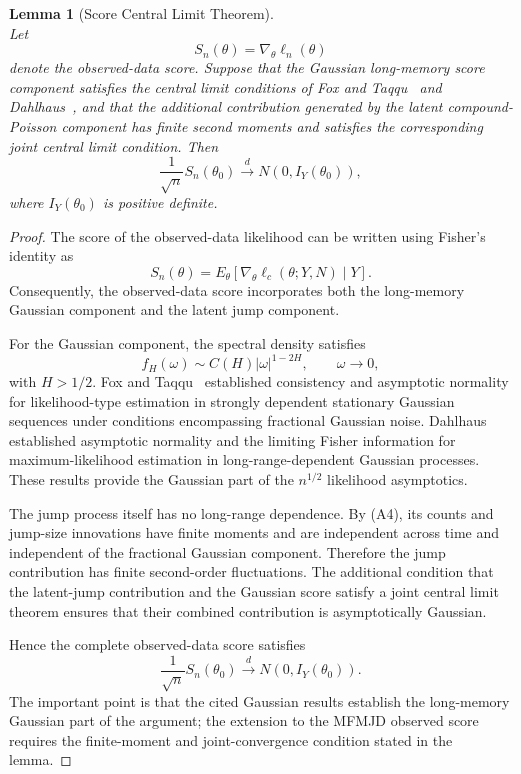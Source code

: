 \documentclass[a4paper,11pt]{amsart}
\newtheorem{lemma}{Lemma}
\theoremstyle{definition}
\theoremstyle{plain}
\theoremstyle{remark}
\newcommand{\1}{\mathbf{1}}
\begin{document}
\begin{lemma}[Score Central Limit Theorem]\mbox{}\\
Let
$$
S_n(\theta)
=
\nabla_\theta\ell_n(\theta)
$$
denote the observed-data score. Suppose that the Gaussian long-memory score component satisfies the central limit conditions of Fox and Taqqu~\cite{FoxTaqqu1986} and Dahlhaus~\cite{Dahlhaus1989}, and that the additional contribution generated by the latent compound-Poisson component has finite second moments and satisfies the corresponding joint central limit condition. 
Then
$$
\frac{1}{\sqrt n}S_n(\theta_0) \xrightarrow{d}
N\left(0,I_Y(\theta_0)\right),
$$
where $I_Y(\theta_0)$ is positive definite.
\end{lemma}

\begin{proof}
The score of the observed-data likelihood can be written using Fisher's identity as
$$
S_n(\theta)
=
E_\theta
\left[
\nabla_\theta
\ell_c(\theta;Y,N)
\mid Y
\right].
$$
Consequently, the observed-data score incorporates both the long-memory Gaussian component and the latent jump component.

For the Gaussian component, the spectral density satisfies
$$
f_H(\omega)
\sim
C(H)|\omega|^{1-2H},
\qquad
\omega\to0,
$$
with $H>1/2$. Fox and Taqqu~\cite{FoxTaqqu1986} established consistency and asymptotic normality for likelihood-type estimation in strongly dependent stationary Gaussian sequences under conditions encompassing fractional Gaussian noise. Dahlhaus~\cite{Dahlhaus1989} established asymptotic normality and the limiting Fisher information for maximum-likelihood estimation in long-range-dependent Gaussian processes. These results provide the Gaussian part of the $n^{1/2}$ likelihood asymptotics.

The jump process itself has no long-range dependence. By (A4), its counts and jump-size innovations have finite moments and are independent across time and independent of the fractional Gaussian component. Therefore the jump contribution has finite second-order fluctuations. The additional condition that the latent-jump contribution and the Gaussian score satisfy a joint central limit theorem ensures that their combined contribution is asymptotically Gaussian.

Hence the complete observed-data score satisfies
$$
\frac{1}{\sqrt n}
S_n(\theta_0)
\xrightarrow{d}
N\left(
0,I_Y(\theta_0)
\right).
$$
The important point is that the cited Gaussian results establish the long-memory Gaussian part of the argument; the extension to the MFMJD observed score requires the finite-moment and joint-convergence condition stated in the lemma.
\end{proof}
\end{document}
